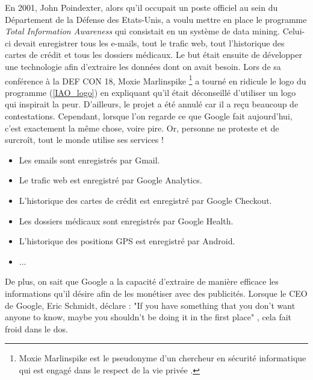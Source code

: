 En 2001, John Poindexter, alors qu'il occupait un poste officiel au sein du Département de la Défense des Etats-Unis, a voulu mettre en place le programme \textit{Total Information Awareness} qui consistait en un système de data mining. Celui-ci devait enregistrer tous les e-mails, tout le trafic web, tout l'historique des cartes de crédit et tous les dossiers médicaux. Le but était ensuite de développer une technologie afin d'extraire les données dont on avait besoin. Lors de sa conférence à la DEF CON 18, Moxie Marlinspike \footnote{Moxie Marlinspike est le pseudonyme d'un chercheur en sécurité informatique qui est engagé dans le respect de la vie privée \cite{site_perso_moxie_marlinspike}.} a tourné en ridicule le logo du programme (\autoref{IAO_logo}) en expliquant qu'il était déconseillé d'utiliser un logo qui inspirait la peur. D'ailleurs, le projet a été annulé car il a reçu beaucoup de contestations. Cependant, lorsque l'on regarde ce que Google fait aujourd'hui, c'est exactement la même chose, voire pire. Or, personne ne proteste et de surcroît, tout le monde utilise ses services !
\begin{itemize}
  \item Les emails sont enregistrés par Gmail.
  \item Le trafic web est enregistré par Google Analytics.
  \item L'historique des cartes de crédit est enregistré par Google Checkout.
  \item Les dossiers médicaux sont enregistrés par Google Health.
  \item L'historique des positions GPS est enregistré par Android.
  \item ...
\end{itemize}
De plus, on sait que Google a la capacité d'extraire de manière efficace les informations qu'il désire afin de les monétiser avec des publicités. Lorsque le CEO de Google, Eric Schmidt, déclare : "If you have something that you don't want anyone to know, maybe you shouldn't be doing it in the first place" \cite{privacy_eric_schmidt}, cela fait froid dans le dos.

